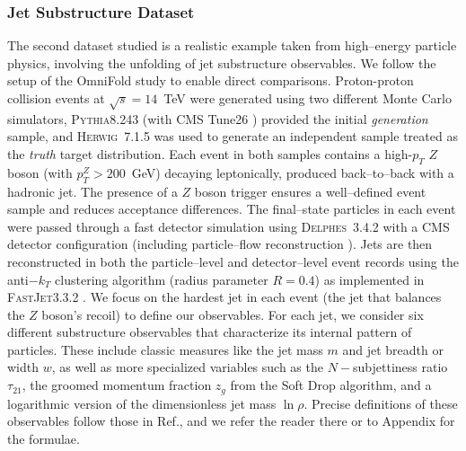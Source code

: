         \subsubsection{Jet Substructure Dataset}
            The second dataset studied is a realistic example taken from high--energy particle physics, involving the unfolding of jet substructure observables.
            We follow the setup of the OmniFold study  to enable direct comparisons.
            Proton-proton collision events at $\sqrt{s}=14$~TeV were generated using two different Monte Carlo simulators, \textsc{Pythia}8.243  (with CMS Tune26 ) provided the initial \emph{generation} sample, and \textsc{Herwig}~7.1.5  was used to generate an independent sample treated as the \emph{truth} target distribution.
            Each event in both samples contains a high-$p_T$ $Z$ boson (with $p_T^Z > 200$~GeV) decaying leptonically, produced back--to--back with a hadronic jet.
            The presence of a $Z$ boson trigger ensures a well--defined event sample and reduces acceptance differences.
            The final--state particles in each event were passed through a fast detector simulation using \textsc{Delphes}~3.4.2  with a CMS detector configuration (including particle--flow reconstruction ).
            Jets are then reconstructed in both the particle--level and detector--level event records using the anti$-k_T$ clustering algorithm  (radius parameter $R=0.4$) as implemented in \textsc{FastJet}3.3.2 .
            We focus on the hardest jet in each event (the jet that balances the $Z$ boson’s recoil) to define our observables.
            For each jet, we consider six different substructure observables that characterize its internal pattern of particles.
            These include classic measures like the jet mass $m$ and jet breadth or width $w$, as well as more specialized variables such as the \(N-\)subjettiness ratio $\tau_{21}$, the groomed momentum fraction $z_g$ from the Soft Drop algorithm, and a logarithmic version of the dimensionless jet mass $\ln\rho$.
            Precise definitions of these observables follow those in Ref., and we refer the reader there or to Appendix  for the formulae.
